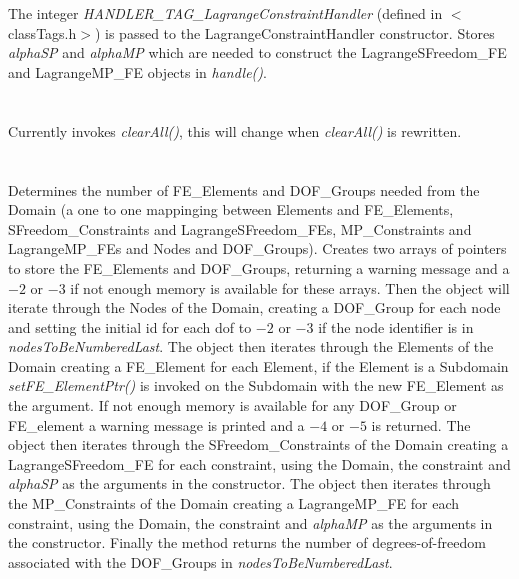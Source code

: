  \\
\\ 
The integer {\em HANDLER\_TAG\_LagrangeConstraintHandler} (defined in
$<$classTags.h$>$) is passed to the LagrangeConstraintHandler
constructor. Stores {\em alphaSP} and {\em alphaMP} which are needed
to construct the LagrangeSFreedom\_FE and LagrangeMP\_FE objects in {\em
handle()}. \\

 \\
\\ 
Currently invokes {\em clearAll()}, this will change when {\em
clearAll()} is rewritten. \\

\\
 \\
Determines the number of FE\_Elements and DOF\_Groups needed from the
Domain (a one to one mappinging between Elements and FE\_Elements,
SFreedom\_Constraints and LagrangeSFreedom\_FEs, MP\_Constraints and LagrangeMP\_FEs and
Nodes and DOF\_Groups). Creates two arrays of pointers to store the
FE\_Elements and DOF\_Groups, returning a warning message and a $-2$
or $-3$ if not enough memory is available for these arrays. Then the
object will iterate through the Nodes of the Domain, creating a
DOF\_Group for each node and setting the initial id for each dof to
$-2$ or $-3$ if the node identifier is in {\em
nodesToBeNumberedLast}. The object then iterates through the Elements
of the Domain creating a FE\_Element for each Element, if the Element
is a Subdomain {\em setFE\_ElementPtr()} is invoked on the Subdomain
with the new FE\_Element as the argument. If not enough memory is
available for any DOF\_Group or FE\_element a warning message is
printed and a $-4$ or $-5$ is returned. 
The object then iterates through the SFreedom\_Constraints
of the Domain creating a LagrangeSFreedom\_FE for each constraint, using the
Domain, the constraint and {\em alphaSP} as the arguments in the
constructor.
The object then iterates through the MP\_Constraints
of the Domain creating a LagrangeMP\_FE for each constraint, using the
Domain, the constraint and {\em alphaMP} as the arguments in the constructor.
Finally the method returns the
number of degrees-of-freedom associated with the DOF\_Groups in {\em
nodesToBeNumberedLast}. \\

